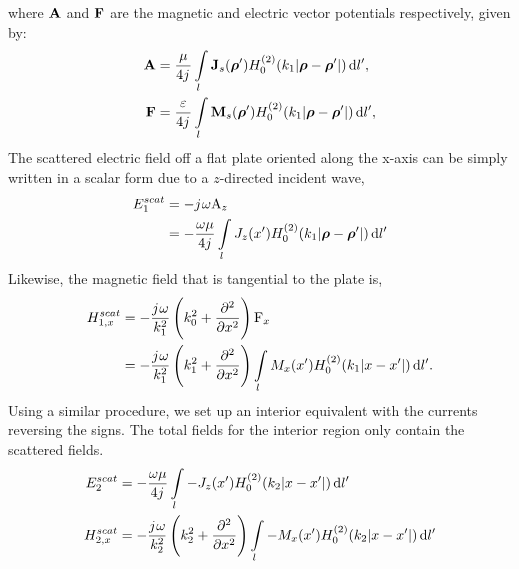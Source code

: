\documentclass[12pt]{article}
\begin{document}
%
where $\mathbf{A}$ and $\mathbf{F}$ are the magnetic and electric vector potentials respectively, given by:
%
\begin{subequations}
  \begin{align}
    \mathbf{A} &=  \frac{\mu}{4 {j}\mkern1mu} \int\limits_{l} \mathbf{J}_s(\boldsymbol {\rho}') H_0^{(2)}(k_1 |\boldsymbol {\rho} - \boldsymbol {\rho}'|) \mathop{}\!\mathrm{d}{l'},
    \label{eq:A}\\
    \mathbf{F} &=  \frac{\varepsilon}{4 {j}\mkern1mu} \int\limits_{l} \mathbf{M}_s(\boldsymbol {\rho}') H_0^{(2)}(k_1 |\boldsymbol {\rho} - \boldsymbol {\rho}'|) \mathop{}\!\mathrm{d}{l'},
    \label{eq:Fig}
  \end{align}
  \label{eq:potentials_2d}%
\end{subequations}%
%
The scattered electric field off a flat plate oriented along the x-axis can be simply written in a scalar form due to a $z$-directed incident wave,
%
\begin{equation}
  \begin{split}
    E_1^{scat} &= -{j}\mkern1mu \omega \mathrm A_z \\
    &= - \frac{\omega \mu}{4 j} \int\limits_{l} J_z(x')  H_0^{(2)}(k_1 |\boldsymbol {\rho} - \boldsymbol {\rho}'|) \mathop{}\!\mathrm{d}{l'}
    \label{eq:E1sc_scalar}
  \end{split}
\end{equation}
%
Likewise, the magnetic field that is tangential to the plate is,
%
\begin{equation}
  \begin{split}
    H_{1,x}^{scat} &= -\frac{{j}\mkern1mu \omega}{k_1^2}\left(k_0^2 +  \pdv[2]{}{x} \right) \mathrm F_x \\
    &= -\frac{{j}\mkern1mu \omega}{k_1^2}\left(k_1^2 +  \pdv[2]{}{x} \right) \int\limits_{l} M_x(x') H_0^{(2)}(k_1 |x - x'|) \mathop{}\!\mathrm{d}{l'}.
  \end{split}
  \label{eq:H1sc_scalar}
\end{equation}
%
Using a similar procedure, we set up an interior equivalent with the currents reversing the signs. The total fields for the interior region only contain the scattered fields.
%
\begin{subequations}
  \begin{align}
    E_2^{scat} &= -\frac{\omega \mu}{4 {j}\mkern1mu} \int\limits_{l} -J_z(x')  H_0^{(2)}(k_2 |x - x'|) \mathop{}\!\mathrm{d}{l'}
    \label{eq:E2sc}\\
    H_{2,x}^{scat} &= - \frac{{j}\mkern1mu \omega}{k_2^2}\left(k_2^2 +  \pdv[2]{}{x} \right) \int\limits_{l} -M_x(x') H_0^{(2)}(k_2 |x - x'|) \mathop{}\!\mathrm{d}{l'}
    \label{eq:H2sc}
  \end{align}
  \label{eq:2sc}%
\end{subequations}%
\end{document}
